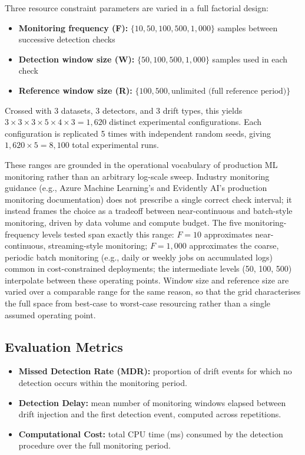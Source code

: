 \documentclass[conference]{IEEEtran}
\begin{document}
Three resource constraint parameters are varied in a full factorial design:

\begin{itemize}
\item \textbf{Monitoring frequency (F):} $\{10, 50, 100, 500, 1{,}000\}$ samples between successive detection checks
\item \textbf{Detection window size (W):} $\{50, 100, 500, 1{,}000\}$ samples used in each check
\item \textbf{Reference window size (R):} $\{100, 500, \text{unlimited (full reference period)}\}$
\end{itemize}

Crossed with 3 datasets, 3 detectors, and 3 drift types, this yields $3 \times 3 \times 3 \times 5 \times 4 \times 3 = 1{,}620$ distinct experimental configurations. Each configuration is replicated 5 times with independent random seeds, giving $1{,}620 \times 5 = 8{,}100$ total experimental runs.

These ranges are grounded in the operational vocabulary of production ML monitoring rather than an arbitrary log-scale sweep. Industry monitoring guidance (e.g., Azure Machine Learning's and Evidently AI's production monitoring documentation) does not prescribe a single correct check interval; it instead frames the choice as a tradeoff between near-continuous and batch-style monitoring, driven by data volume and compute budget. The five monitoring-frequency levels tested span exactly this range: $F=10$ approximates near-continuous, streaming-style monitoring; $F=1{,}000$ approximates the coarse, periodic batch monitoring (e.g., daily or weekly jobs on accumulated logs) common in cost-constrained deployments; the intermediate levels (50, 100, 500) interpolate between these operating points. Window size and reference size are varied over a comparable range for the same reason, so that the grid characterises the full space from best-case to worst-case resourcing rather than a single assumed operating point.

\subsection{Evaluation Metrics}

\begin{itemize}
\item \textbf{Missed Detection Rate (MDR):} proportion of drift events for which no detection occurs within the monitoring period.
\item \textbf{Detection Delay:} mean number of monitoring windows elapsed between drift injection and the first detection event, computed across repetitions.
\item \textbf{Computational Cost:} total CPU time (ms) consumed by the detection procedure over the full monitoring period.
\end{itemize}
\end{document}
